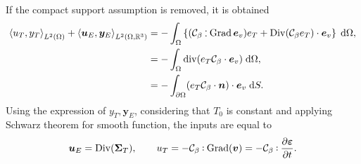If the compact support assumption is removed, it is obtained
\begin{equation}\label{eq:balIntThElas}
	\begin{aligned}
	\left\langle u_T, y_T \right\rangle_{L^2(\Omega)} + \left\langle \bm{u}_E, \bm{y}_E \right\rangle_{L^2(\Omega, \mathbb{R}^3)} &= -\int_\Omega \left\{(\mathcal{C}_\beta \cddot \Grad \bm{e}_v) e_T + \Div(\mathcal{C}_\beta e_T) \cdot \bm{e}_v \right\} \d\Omega, \\
	&= -\int_{\Omega} \div(e_T \mathcal{C}_\beta \cdot \bm{e}_v ) \d\Omega, \\
	&= -\int_{\partial \Omega} (e_T \mathcal{C}_\beta \cdot \bm{n}) \cdot \bm{e}_v  \d{S}.
	\end{aligned}
\end{equation}
Using the expression of $y_T, \bm{y}_E$, considering that $T_0$ is constant and applying Schwarz theorem for smooth function, the inputs are equal to
\begin{equation*}
\bm{u}_E =  \Div(\bm{\Sigma}_T), \qquad u_T = - \mathcal{C}_\beta \cddot  \Grad(\bm{v}) = - \mathcal{C}_\beta \cddot  \diffp{\bm{\varepsilon}}{t} .
\end{equation*}

